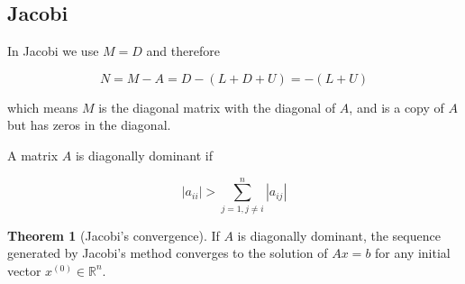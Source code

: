 \documentclass[12pt]{article}
\theoremstyle{definition}
\newtheorem{theorem}{Theorem}
\begin{document}
\subsection{Jacobi}

In Jacobi we use $M = D$ and therefore 

\begin{equation*}
    N = M - A = D - (L + D + U) = -(L + U)
\end{equation*}

which means $M$ is the diagonal matrix with the diagonal of $A$, and is a copy
of $A$ but has zeros in the diagonal.

\begin{definition}
    A matrix $A$ is diagonally dominant if 

    \begin{equation*}
        \left| a_{ii} \right| > \sum_{j=1, j \neq i}^n \left| a_{ij} \right| 
    \end{equation*}
\end{definition}

\begin{theorem}[Jacobi's convergence]
    If $A$ is diagonally dominant, the sequence generated by Jacobi's method
    converges to the solution of $Ax = b$ for any initial vector $x^{(0)} \in
    \mathbb{R}^n$.
\end{theorem}
\end{document}
